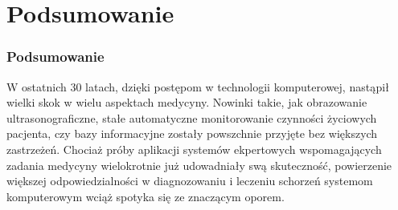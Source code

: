 \section{Podsumowanie}

\begin{frame}
\frametitle{Podsumowanie}

W ostatnich 30 latach, dzięki postępom w technologii komputerowej, nastąpił wielki skok w wielu aspektach medycyny.
Nowinki takie, jak obrazowanie ultrasonograficzne, stałe automatyczne monitorowanie czynności życiowych pacjenta, czy bazy informacyjne zostały powszchnie przyjęte bez większych zastrzeżeń.
Chociaż próby aplikacji systemów ekpertowych wspomagających zadania medycyny wielokrotnie już udowadniały swą skuteczność, powierzenie większej odpowiedzialności w diagnozowaniu i leczeniu schorzeń systemom komputerowym wciąż spotyka się ze znaczącym oporem.
\end{frame}

